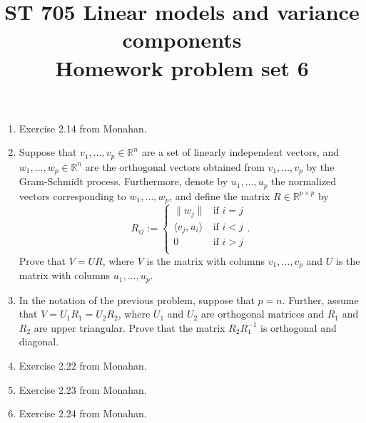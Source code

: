 \documentclass[11pt]{article}
\title{ST 705 Linear models and variance components \\ 
        Homework problem set 6}
\begin{document}
\maketitle

\begin{enumerate}

\item Exercise 2.14 from Monahan.

\item Suppose that $v_{1},\dots,v_{p} \in \mathbb{R}^{n}$ are a set of linearly independent vectors, and $w_{1},\dots,w_{p} \in \mathbb{R}^{n}$ are the orthogonal vectors obtained from $v_{1},\dots,v_{p}$ by the Gram-Schmidt process.  Furthermore, denote by $u_{1},\dots,u_{p}$ the normalized vectors corresponding to $w_{1},\dots,w_{p}$, and define the matrix $R \in \mathbb{R}^{p\times p}$ by
\[
R_{ij} :=
\begin{cases}
\|w_{j}\| & \text{if } i=j \\
\langle v_{j}, u_i\rangle & \text{if } i<j \\
0 & \text{if } i>j \\
\end{cases}.
\]
Prove that $V = UR$, where $V$ is the matrix with columns $v_{1},\dots,v_{p}$ and $U$ is the matrix with columns $u_{1},\dots,u_{p}$.

\item In the notation of the previous problem, suppose that $p = n$.  Further, assume that $V = U_{1}R_{1} = U_{2}R_{2}$, where $U_{1}$ and $U_{2}$ are orthogonal matrices and $R_{1}$ and $R_{2}$ are upper triangular.  Prove that the matrix $R_{2}R_{1}^{-1}$ is orthogonal and diagonal.

\item Exercise 2.22 from Monahan.

\item Exercise 2.23 from Monahan.

\item Exercise 2.24 from Monahan.


\end{enumerate}
\end{document}
